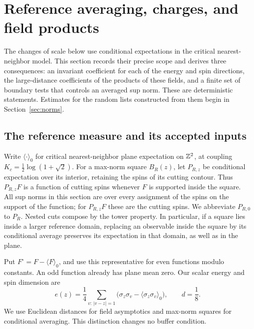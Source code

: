 \section{Reference averaging, charges, and field products}\label{sec:reference}

The changes of scale below use conditional expectations in the critical
nearest-neighbor model.  This section records their precise scope and derives
three consequences: an invariant coefficient for each of the energy and spin
directions, the large-distance coefficients of the products of these fields,
and a finite set of boundary tests that controls an averaged sup norm.  These
are deterministic statements.  Estimates for the random lists constructed
from them begin in Section~\ref{sec:norms}.

\subsection{The reference measure and its accepted inputs}

Write $\langle\cdot\rangle_0$ for critical nearest-neighbor plane expectation
on $\mathbb Z^2$, at coupling $K_c=\frac12\log(1+\sqrt2)$.  For a max-norm square
$B_R(z)$, let $P_{R,z}$ be conditional expectation over its interior, retaining
the spins of its cutting contour.  Thus $P_{R,z}F$ is a function of cutting
spins whenever $F$ is supported inside the square.  All sup norms in this
section are over every assignment of the spins on the support of the
function; for $P_{R,z}F$ these are the cutting spins.  We abbreviate
$P_{R,0}$ to $P_R$.  Nested cuts compose by the tower property.  In particular,
if a square lies inside a larger reference domain, replacing an observable
inside the square by its conditional average preserves its expectation in
that domain, as well as in the plane.

Put $F^\circ=F-\langle F\rangle_0$, and use this representative for even
functions modulo constants.  An odd function already has plane mean zero.
Our scalar energy and spin dimension are
\begin{equation}\label{ref:energy}
 e(z)=\frac14\sum_{v:\,|v-z|=1}
       \bigl(\sigma_z\sigma_v-\langle\sigma_z\sigma_v\rangle_0\bigr),
 \qquad d=\frac18.
\end{equation}
We use Euclidean distances for field asymptotics and max-norm squares for
conditional averaging.  This distinction changes no buffer condition.

